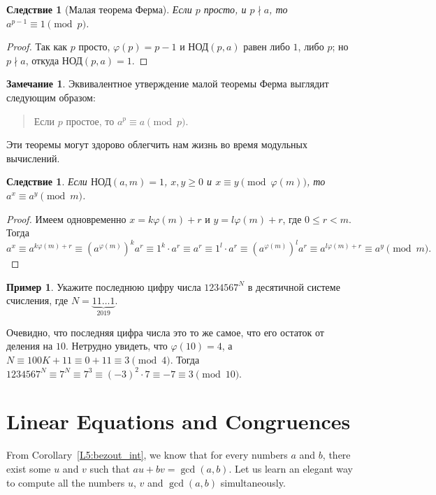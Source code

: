 \documentclass[12pt,notitlepage]{article}
\theoremstyle{plain}
\newtheorem{corr}[thm]{Следствие}
\theoremstyle{definition}
\newtheorem{exm}[thm]{Пример}
\newtheorem{rem}[thm]{Замечание}
\theoremstyle{plain}
\renewcommand{\phi}{\varphi}
\newcommand{\1}{\mathbf{1}}
\newcommand{\0}{\mathbf{0}}
\newcommand{\ndvd}{\mathop{\nmid}}
\begin{document}
\begin{corr}[Малая теорема Ферма]
	Если $p$ просто, и $p \ndvd a$, то $a^{p - 1} \equiv 1 \pmod p$.
\end{corr}
\begin{proof}
	Так как $p$ просто, $\phi(p) = p - 1$ и $\text{НОД}(p, a)$ равен либо $1$, либо $p$; но $p \ndvd a$, откуда $\text{НОД}(p,a) = 1$.
\end{proof}
\begin{rem}
	Эквивалентное утверждение малой теоремы Ферма выглядит следующим образом:
	\begin{quote}
		Если $p$ простое, то $a^p \equiv a \pmod p$.
	\end{quote}
\end{rem}
\noindent  Эти теоремы могут здорово облегчить нам жизнь во время модульных вычислений.
\begin{corr}
	Если $\text{НОД}(a, m) = 1$, $x, y \geq 0$ и $x \equiv y \pmod {\phi(m)}$, то $a^x \equiv a^y \pmod m$.
\end{corr}
\begin{proof}
	Имеем одновременно $x = k\phi(m) + r$ и $y = l\phi(m) + r$, где $0 \leq r < m$. Тогда
	$$a^x \equiv a^{k\phi(m) + r} \equiv (a^{\phi(m)})^k a^r \equiv 1^k \cdot a^r \equiv a^r \equiv 1^l \cdot a^r \equiv (a^{\phi(m)})^l a^r \equiv a^{l\phi(m) + r} \equiv a^y \pmod m.$$
\end{proof}
\begin{exm}
	Укажите последнюю цифру числа $1234567^N$ в десятичной системе счисления, где $N = {\underbrace{11\ldots1}_{2019}}$.
	
	Очевидно, что последняя цифра числа это то же самое, что его остаток от деления на $10$. Нетрудно увидеть, что $\phi(10) = 4$, а $N \equiv 100K + 11 \equiv 0 + 11 \equiv 3 \pmod 4$. Тогда $1234567^N \equiv 7^N \equiv 7^3 \equiv (-3)^2 \cdot 7 \equiv -7 \equiv 3 \pmod{10}$.
\end{exm}



\section{Linear Equations and Congruences}

From Corollary~\ref{L5:bezout_int}, we know that for every numbers $a$ and $b$, there exist some $u$ and $v$ such that $a u + b v = \gcd(a,b)$. Let us learn an elegant way to compute all the numbers $u$, $v$ and $\gcd(a,b)$ simultaneously.
\end{document}
